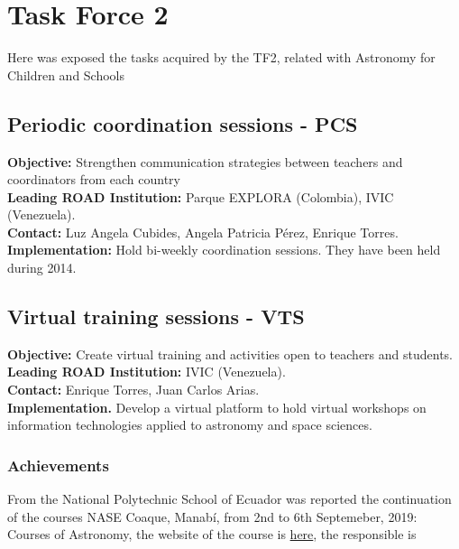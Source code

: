 \newpage
\section{Task Force 2}
\label{chapter3}

Here was exposed the tasks acquired by the TF2, related with Astronomy for Children and Schools

\subsection{Periodic coordination sessions - PCS}
\textbf{Objective:} Strengthen communication strategies between teachers and coordinators from each country 
\\
\textbf{Leading ROAD Institution:} Parque EXPLORA (Colombia), IVIC (Venezuela).
\\
\textbf{Contact:} Luz Angela Cubides, Angela Patricia Pérez, Enrique Torres.
\\
\textbf{Implementation:} Hold bi-weekly coordination sessions. They have been held during 2014.





\subsection{Virtual training sessions - VTS}
\textbf{Objective:} Create virtual training and activities open to teachers and students.
\\
\textbf{Leading ROAD Institution:} IVIC (Venezuela).
\\
\textbf{Contact:} Enrique Torres, Juan Carlos Arias.
\\
\textbf{Implementation.} Develop a virtual platform to hold virtual workshops on information technologies applied to astronomy and space sciences.

\subsubsection{Achievements}
From the National Polytechnic School of Ecuador was reported the continuation of the courses NASE Coaque, Manabí, from 2nd to 6th Septemeber, 2019: Courses of Astronomy, the website of the course is \href{http://sac.csic.es/astrosecundaria/es/cursos/realizados/reglados/145_ecuador_2019/ListaDocs.php}{here}, the responsible is %




